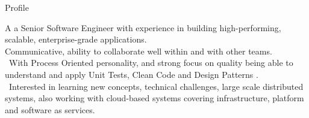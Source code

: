 
\begin{jrsection}[location = sidebar]{Profile}
    \begin{jrdescription}
    A a Senior Software Engineer with experience in building high-performing,
    scalable, enterprise-grade applications. \\
    Communicative, ability to collaborate well within and with other teams.\\
    \linebreak\
    With Process Oriented personality, and strong focus on quality being able to understand and apply Unit Tests,
    Clean Code and Design Patterns .\\
    \linebreak\
    Interested in learning new concepts, technical challenges,
    large scale distributed systems,
    also working with cloud-based systems covering infrastructure, platform and software as services.\\
    \end{jrdescription}
\end{jrsection}
